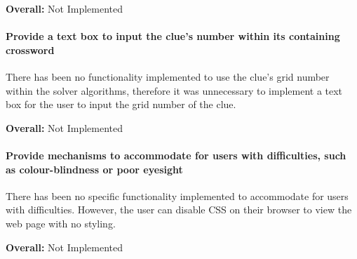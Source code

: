 {\bf Overall:} Not Implemented


\paragraph{Provide a text box to input the clue's number within its containing
crossword}

There has been no functionality implemented to use the clue's grid number
within the solver algorithms, therefore it was unnecessary to implement a text
box for the user to input the grid number of the clue.
 
{\bf Overall:} Not Implemented


\paragraph{Provide mechanisms to accommodate for users with difficulties, such
as colour-blindness or poor eyesight}
    
There has been no specific functionality implemented to accommodate for  users
with difficulties. However, the user can disable CSS on their browser  to view
the web page with no styling.

{\bf Overall:} Not Implemented

